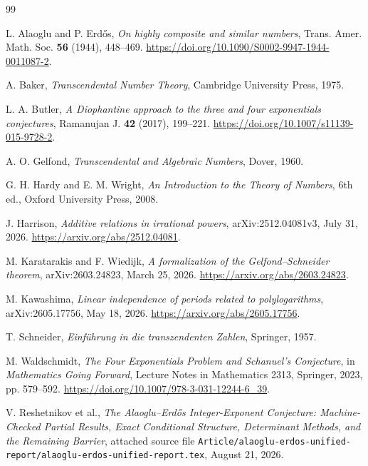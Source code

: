 \documentclass[11pt,oneside]{article}
\theoremstyle{definition}
\theoremstyle{remark}
\begin{document}
\begin{thebibliography}{99}

L. Alaoglu and P. Erd\H{o}s,
\newblock \emph{On highly composite and similar numbers},
\newblock Trans. Amer. Math. Soc. \textbf{56} (1944), 448--469.
\newblock \url{https://doi.org/10.1090/S0002-9947-1944-0011087-2}.

A. Baker,
\newblock \emph{Transcendental Number Theory},
\newblock Cambridge University Press, 1975.

L. A. Butler,
\newblock \emph{A Diophantine approach to the three and four exponentials conjectures},
\newblock Ramanujan J. \textbf{42} (2017), 199--221.
\newblock \url{https://doi.org/10.1007/s11139-015-9728-2}.

A. O. Gelfond,
\newblock \emph{Transcendental and Algebraic Numbers},
\newblock Dover, 1960.

G. H. Hardy and E. M. Wright,
\newblock \emph{An Introduction to the Theory of Numbers}, 6th ed.,
\newblock Oxford University Press, 2008.

J. Harrison,
\newblock \emph{Additive relations in irrational powers},
\newblock arXiv:2512.04081v3, July 31, 2026.
\newblock \url{https://arxiv.org/abs/2512.04081}.

M. Karatarakis and F. Wiedijk,
\newblock \emph{A formalization of the Gelfond--Schneider theorem},
\newblock arXiv:2603.24823, March 25, 2026.
\newblock \url{https://arxiv.org/abs/2603.24823}.

M. Kawashima,
\newblock \emph{Linear independence of periods related to polylogarithms},
\newblock arXiv:2605.17756, May 18, 2026.
\newblock \url{https://arxiv.org/abs/2605.17756}.

T. Schneider,
\newblock \emph{Einf\"uhrung in die transzendenten Zahlen},
\newblock Springer, 1957.

M. Waldschmidt,
\newblock \emph{The Four Exponentials Problem and Schanuel's Conjecture},
\newblock in \emph{Mathematics Going Forward}, Lecture Notes in Mathematics
2313, Springer, 2023, pp. 579--592.
\newblock \url{https://doi.org/10.1007/978-3-031-12244-6_39}.

V. Reshetnikov et al.,
\newblock \emph{The Alaoglu--Erd\H{o}s Integer-Exponent Conjecture: Machine-Checked
Partial Results, Exact Conditional Structure, Determinant Methods, and the Remaining Barrier},
\newblock attached source file
\texttt{Article/alaoglu-erdos-unified-report/alaoglu-erdos-unified-report.tex},
August 21, 2026.

\end{thebibliography}
\end{document}
